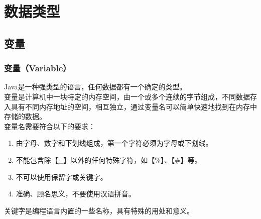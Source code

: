 \chapter{数据类型}

\section{变量}

\subsection{变量（Variable）}

Java是一种强类型的语言，任何数据都有一个确定的类型。 \\

变量是计算机中一块特定的内存空间，由一个或多个连续的字节组成，不同数据存入具有不同内存地址的空间，相互独立，通过变量名可以简单快速地找到在内存中存储的数据。 \\

变量名需要符合以下的要求：

\begin{enumerate}
	\item 由字母、数字和下划线组成，第一个字符必须为字母或下划线。
	\item 不能包含除【\_】以外的任何特殊字符，如【\%】、【\#】等。
	\item 不可以使用保留字或关键字。
	\item 准确、顾名思义，不要使用汉语拼音。
\end{enumerate}

关键字是编程语言内置的一些名称，具有特殊的用处和意义。

\begin{table}[H]
	\centering
	\caption{关键字}
\end{table}

